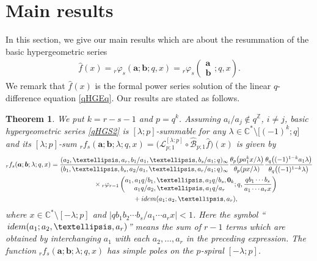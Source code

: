 \documentclass[11pt]{article}
\numberwithin{equation}{section}
\newtheorem{Theorem}{Theorem}[section]
\newcommand{\idem}{{\rm idem}}
\begin{document}
\section{Main results}\label{Section:Main Results}
In this section, we give our main results which are about the resummation of the basic hypergeometric series
\begin{gather}\label{qHGS2}
\hat{f}(x)={}_r\varphi_s(\bm{a};\bm{b};q,x)={}_r\varphi_s\left( \begin{matrix}\bm{a}\\ \bm{b} \end{matrix};q,x\right).
\end{gather}
We remark that $\hat{f}(x)$ is the formal power series solution of the linear $q$-difference equation \eqref{qHGEq}. Our results are stated as follows.
\begin{Theorem}\label{Theorem:Main1}
We put $k=r-s-1$ and $p=q^k$. Assuming $a_i/a_j\notin q^{\mathbb{Z}}$, $i\neq j$, basic hypergeometric series \eqref{qHGS2} is $[\lambda;p]$-summable for any $\lambda\in\mathbb{C}^*\setminus\big[(-1)^{k};q\big]$ and its $[\lambda;p]$-sum ${}_rf_s(\bm{a};\bm{b};\lambda;q,x)=\big(\mathcal{L}_{p;1}^{[\lambda:p]}\circ\mathcal{\hat{B}}_{p;1}\hat{f}\big)(x)$ is given by
\begin{gather}
{}_rf_s(\bm{a};\bm{b};\lambda;q,x) =\frac{(a_2,\ldots,a_r,b_1/a_1,\ldots,b_{s}/a_1;q)_\infty}{(b_1,\ldots,b_{s},a_2/a_1,\ldots,a_r/a_1;q)_\infty}\frac{\theta_{p}\big(pa_1^kx/\lambda\big)}{\theta_{p}(px/\lambda)}
\frac{\theta_q\big((-1)^{1-k}a_1\lambda\big)}{\theta_q\big((-1)^{1-k}\lambda\big)}\nonumber\\
\hphantom{{}_rf_s(\bm{a};\bm{b};\lambda;q,x) =}{}
\times{}_r\varphi_{r-1}\left(\begin{matrix}a_1,a_1q/b_1,\ldots,a_1q/b_s,\bm{0}_k\\a_1q/a_2,\ldots,a_1q/a_r
\end{matrix} ;q,\frac{qb_1\cdots b_s}{a_1\cdots a_rx}\right)\nonumber\\
\hphantom{{}_rf_s(\bm{a};\bm{b};\lambda;q,x) =}{}
+\idem(a_1;a_2,\ldots,a_r),\label{Main1}
\end{gather}
where $x\in\mathbb{C}^*\setminus[-\lambda;p]$ and $|qb_1b_2\cdots b_s/a_1\cdots a_rx|<1$. Here the symbol ``$\,\idem(a_1;a_2,\ldots,a_r)$'' means the sum of $r-1$ terms which are obtained by interchanging $a_1$ with each $a_2,\ldots,a_r$ in the preceding expression.
The function ${}_rf_s(\bm{a};\bm{b};\lambda;q,x)$ has simple poles on the $p$-spiral $[-\lambda;p]$.
\end{Theorem}
\end{document}
